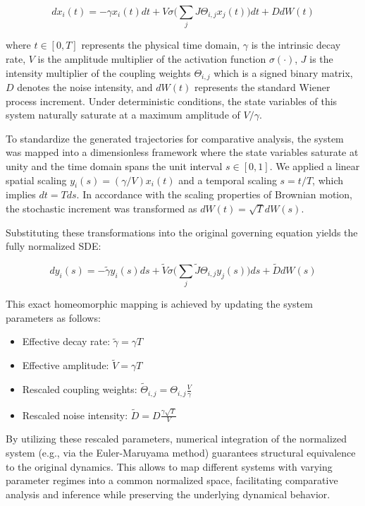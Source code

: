 \documentclass[10pt, aps, rmp,  twocolumn, superscriptaddress, floatfix, showkeys]{revtex4-2}
\begin{document}
\[dx_i(t) = -\gamma x_i(t)dt + V \sigma\Big(\sum_j J \Theta_{i,j} x_j(t)\Big)dt + D dW(t)\]


where $t \in [0, T]$ represents the physical time domain, $\gamma$ is the intrinsic decay rate, $V$ is the amplitude multiplier of the activation function $\sigma(\cdot)$, $J$ is the intensity multiplier of the coupling weights $\Theta_{i,j}$ which is a signed binary matrix, $D$ denotes the noise intensity, and $dW(t)$ represents the standard Wiener process increment. Under deterministic conditions, the state variables of this system naturally saturate at a maximum amplitude of $V/\gamma$.

To standardize the generated trajectories for comparative analysis, the system was mapped into a dimensionless framework where the state variables saturate at unity and the time domain spans the unit interval $s \in [0, 1]$. We applied a linear spatial scaling $y_i(s) = (\gamma/V) x_i(t)$ and a temporal scaling $s = t/T$, which implies $dt = T ds$. In accordance with the scaling properties of Brownian motion, the stochastic increment was transformed as $dW(t) = \sqrt{T} dW(s)$.

Substituting these transformations into the original governing equation yields the fully normalized SDE:


\[dy_i(s) = -\tilde{\gamma} y_i(s)ds + \tilde{V} \sigma\Big(\sum_j \tilde{J}\Theta_{i,j} y_j(s)\Big)ds + \tilde{D} dW(s)\]

This exact homeomorphic mapping is achieved by updating the system parameters as follows:
\begin{itemize}
    \item Effective decay rate: $\tilde{\gamma} = \gamma T$
    \item Effective amplitude: $\tilde{V} = \gamma T$
    \item Rescaled coupling weights: $\tilde{\Theta}_{i,j} = \Theta_{i,j} \frac{V}{\gamma}$
    \item Rescaled noise intensity: $\tilde{D} = D \frac{\gamma \sqrt{T}}{V}$
\end{itemize}

By utilizing these rescaled parameters, numerical integration of the normalized system (e.g., via the Euler-Maruyama method) guarantees structural equivalence to the original dynamics. This allows to map different systems with varying parameter regimes into a common normalized space, facilitating comparative analysis and inference while preserving the underlying dynamical behavior.
\end{document}
